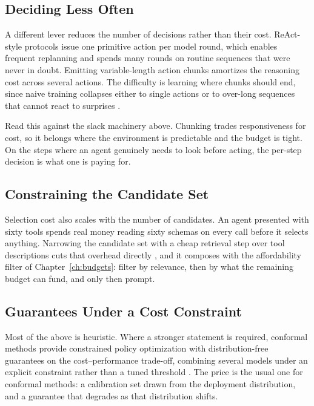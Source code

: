 \documentclass[11pt]{book}
\begin{document}
\subsection{Deciding Less Often}

A different lever reduces the number of decisions rather than their cost. ReAct-style protocols issue one primitive action per model round, which enables frequent replanning and spends many rounds on routine sequences that were never in doubt. Emitting variable-length action chunks amortizes the reasoning cost across several actions. The difficulty is learning where chunks should end, since naive training collapses either to single actions or to over-long sequences that cannot react to surprises \cite{chunking2026}.

Read this against the slack machinery above. Chunking trades responsiveness for cost, so it belongs where the environment is predictable and the budget is tight. On the steps where an agent genuinely needs to look before acting, the per-step decision is what one is paying for.

\subsection{Constraining the Candidate Set}

Selection cost also scales with the number of candidates. An agent presented with sixty tools spends real money reading sixty schemas on every call before it selects anything. Narrowing the candidate set with a cheap retrieval step over tool descriptions cuts that overhead directly \cite{autotool2026}, and it composes with the affordability filter of Chapter~\ref{ch:budgets}: filter by relevance, then by what the remaining budget can fund, and only then prompt.

\subsection{Guarantees Under a Cost Constraint}

Most of the above is heuristic. Where a stronger statement is required, conformal methods provide constrained policy optimization with distribution-free guarantees on the cost--performance trade-off, combining several models under an explicit constraint rather than a tuned threshold \cite{conformalcpo2026}. The price is the usual one for conformal methods: a calibration set drawn from the deployment distribution, and a guarantee that degrades as that distribution shifts.
\end{document}

